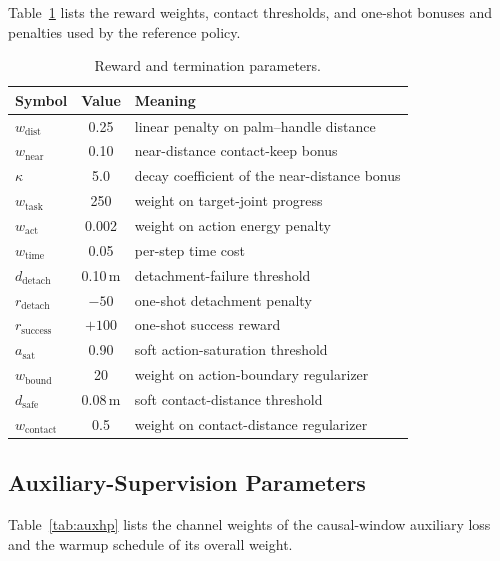 Table~\ref{tab:rewhp} lists the reward weights, contact thresholds, and
one-shot bonuses and penalties used by the reference policy.

\begin{table}[ht]
\centering
\caption{Reward and termination parameters.}
\label{tab:rewhp}
\small
\begin{tabular}{lcl}
\toprule
Symbol & Value & Meaning \\
\midrule
$w_{\mathrm{dist}}$    & 0.25      & linear penalty on palm--handle distance \\
$w_{\mathrm{near}}$    & 0.10      & near-distance contact-keep bonus \\
$\kappa$               & 5.0       & decay coefficient of the near-distance bonus \\
$w_{\mathrm{task}}$    & 250       & weight on target-joint progress \\
$w_{\mathrm{act}}$     & 0.002     & weight on action energy penalty \\
$w_{\mathrm{time}}$    & 0.05      & per-step time cost \\
$d_{\mathrm{detach}}$  & 0.10\,m   & detachment-failure threshold \\
$r_{\mathrm{detach}}$  & $-50$     & one-shot detachment penalty \\
$r_{\mathrm{success}}$ & $+100$    & one-shot success reward \\
$a_{\mathrm{sat}}$     & 0.90      & soft action-saturation threshold \\
$w_{\mathrm{bound}}$   & 20        & weight on action-boundary regularizer \\
$d_{\mathrm{safe}}$    & 0.08\,m   & soft contact-distance threshold \\
$w_{\mathrm{contact}}$ & 0.5       & weight on contact-distance regularizer \\
\bottomrule
\end{tabular}
\end{table}


\subsection{Auxiliary-Supervision Parameters}
\label{app:auxhp}

Table~\ref{tab:auxhp} lists the channel weights of the causal-window
auxiliary loss and the warmup schedule of its overall weight.

